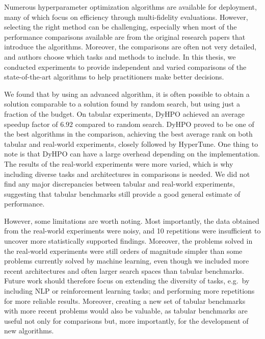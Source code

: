 




Numerous hyperparameter optimization algorithms are available for deployment, many of which focus on efficiency through multi-fidelity evaluations. However, selecting the right method can be challenging, especially when most of the performance comparisons available are from the original research papers that introduce the algorithms. Moreover, the comparisons are often not very detailed, and authors choose which tasks and methods to include. In this thesis, we conducted experiments to provide independent and varied comparisons of the state-of-the-art algorithms to help practitioners make better decisions.

We found that by using an advanced algorithm, it is often possible to obtain a solution comparable to a solution found by random search, but using just a fraction of the budget. On tabular experiments, DyHPO achieved an average speedup factor of $6.92$ compared to random search. DyHPO proved to be one of the best algorithms in the comparison, achieving the best average rank on both tabular and real-world experiments, closely followed by HyperTune. One thing to note is that DyHPO can have a large overhead depending on the implementation. The results of the real-world experiments were more varied, which is why including diverse tasks and architectures in comparisons is needed. We did not find any major discrepancies between tabular and real-world experiments, suggesting that tabular benchmarks still provide a good general estimate of performance.

However, some limitations are worth noting. Most importantly, the data obtained from the real-world experiments were noisy, and 10 repetitions were insufficient to uncover more statistically supported findings. Moreover, the problems solved in the real-world experiments were still orders of magnitude simpler than some problems currently solved by machine learning, even though we included more recent architectures and often larger search spaces than tabular benchmarks. Future work should therefore focus on extending the diversity of tasks, e.g.\ by including NLP or reinforcement learning tasks; and performing more repetitions for more reliable results. Moreover, creating a new set of tabular benchmarks with more recent problems would also be valuable, as tabular benchmarks are useful not only for comparisons but, more importantly, for the development of new algorithms.
